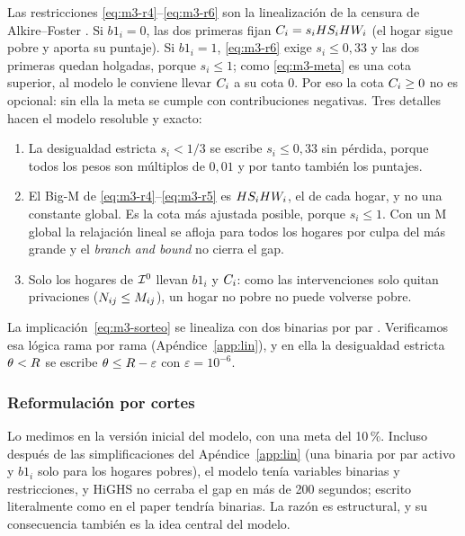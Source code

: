 Las restricciones \eqref{eq:m3-r4}--\eqref{eq:m3-r6} son la linealización de
la censura de Alkire--Foster \citep[Lin~1--5]{hamie2024}. Si $b1_i=0$, las dos
primeras fijan $C_i=s_iHS_iHW_i$ (el hogar sigue pobre y aporta su puntaje).
Si $b1_i=1$, \eqref{eq:m3-r6} exige $s_i\le 0{,}33$ y las dos primeras quedan
holgadas, porque $s_i\le 1$; como \eqref{eq:m3-meta} es una cota superior, al
modelo le conviene llevar $C_i$ a su cota $0$. Por eso la cota
$C_i\ge 0$ no es opcional: sin ella la meta se cumple con contribuciones
negativas. Tres detalles hacen el modelo resoluble y exacto:
\begin{enumerate}
\item La desigualdad estricta $s_i<1/3$ se escribe $s_i\le 0{,}33$ sin pérdida,
  porque todos los pesos son múltiplos de $0{,}01$ y por tanto también los
  puntajes.
\item El Big-M de \eqref{eq:m3-r4}--\eqref{eq:m3-r5} es $HS_iHW_i$, el de cada
  hogar, y no una constante global. Es la cota más ajustada posible, porque
  $s_i\le 1$. Con un M global la relajación lineal se afloja para todos los
  hogares por culpa del más grande y el \emph{branch and bound} no cierra el gap.
\item Solo los hogares de $\mathcal{I}^0$ llevan $b1_i$ y $C_i$: como las
  intervenciones solo quitan privaciones ($N_{ij}\le M_{ij}$), un hogar no
  pobre no puede volverse pobre.
\end{enumerate}
La implicación~\eqref{eq:m3-sorteo} se linealiza con dos binarias por par
\citep[Lin~6--10]{hamie2024}. Verificamos esa lógica rama por rama
(Apéndice~\ref{app:lin}), y en ella la desigualdad estricta $\theta<R$ se escribe
$\theta\le R-\varepsilon$ con $\varepsilon=10^{-6}$.

\subsubsection{Reformulación por cortes}

Lo medimos en la versión inicial del modelo, con una meta del 10\,\%. Incluso
después de las simplificaciones del Apéndice~\ref{app:lin} (una binaria por par
activo y $b1_i$ solo para los hogares pobres), el modelo tenía
\cBinDirecta{} variables binarias y \cRestrDirecta{} restricciones, y HiGHS no
cerraba el gap en más de 200 segundos; escrito literalmente como en el paper
tendría \cBinPaper{} binarias.
La razón es estructural, y su consecuencia también es la idea central del modelo.

